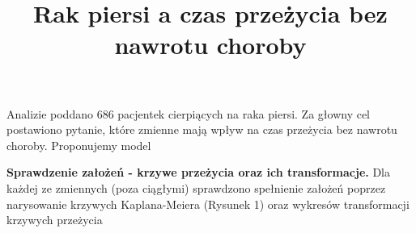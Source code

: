 \documentclass[]{article}
\title{Rak piersi a czas przeżycia bez nawrotu choroby}
\author{}
\date{}
\begin{document}
\maketitle


\thispagestyle{fancy}

Analizie poddano 686 pacjentek cierpiących na raka piersi. Za głowny cel
postawiono pytanie, które zmienne mają wpływ na czas przeżycia
bez nawrotu choroby. Proponujemy model

\textbf{Sprawdzenie założeń - krzywe przeżycia oraz ich transformacje.}
\newline
Dla każdej ze zmiennych (poza
ciągłymi) sprawdzono spełnienie założeń poprzez narysowanie krzywych Kaplana-Meiera (Rysunek 1) oraz
wykresów transformacji  krzywych przeżycia 
\end{document}
